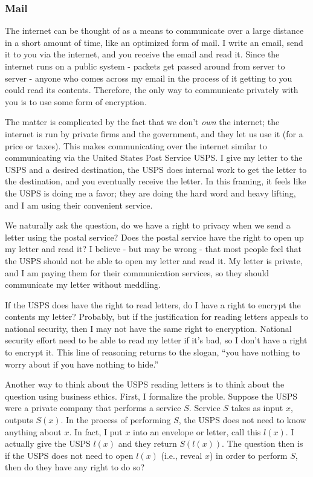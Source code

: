 \documentclass[11pt]{article}
\begin{document}
\subsubsection{Mail}

The internet can be thought of as a means to communicate over a large distance in a short amount of time, like an optimized form of mail.
I write an email, send it to you via the internet, and you receive the email and read it.
Since the internet runs on a public system - packets get passed around from server to server - anyone who comes across my email in the process of it getting to you could read its contents.
Therefore, the only way to communicate privately with you is to use some form of encryption.

The matter is complicated by the fact that we don't \textit{own} the internet; the internet is run by private firms and the government, and they let us use it (for a price or taxes). 
This makes communicating over the internet similar to communicating via the United States Post Service USPS.
I give my letter to the USPS and a desired destination, the USPS does internal work to get the letter to the destination, and you eventually receive the letter.
In this framing, it feels like the USPS is doing me a favor; they are doing the hard word and heavy lifting, and I am using their convenient service.

We naturally ask the question, do we have a right to privacy when we send a letter using the postal service?
Does the postal service have the right to open up my letter and read it?
I believe - but may be wrong - that most people feel that the USPS should not be able to open my letter and read it. 
My letter is private, and I am paying them for their communication services, so they should communicate my letter without meddling.

If the USPS does have the right to read letters, do I have a right to encrypt the contents my letter?
Probably, but if the justification for reading letters appeals to national security, then I may not have the same right to encryption.
National security effort need to be able to read my letter if it's bad, so I don't have a right to encrypt it.
This line of reasoning returns to the slogan, ``you have nothing to worry about if you have nothing to hide.''

Another way to think about the USPS reading letters is to think about the question using business ethics.
First, I formalize the proble.
Suppose the USPS were a private company that performs a service $S$.
Service $S$ takes as input $x$, outputs $S(x)$.
In the process of performing $S$, the USPS does not need to know anything about $x$.
In fact, I put $x$ into an envelope or letter, call this $l(x)$.
I actually give the USPS $l(x)$ and they return $S(l(x))$.
The question then is if the USPS does not need to open $l(x)$ (i.e., reveal $x$) in order to perform $S$, then do they have any right to do so?
\end{document}
